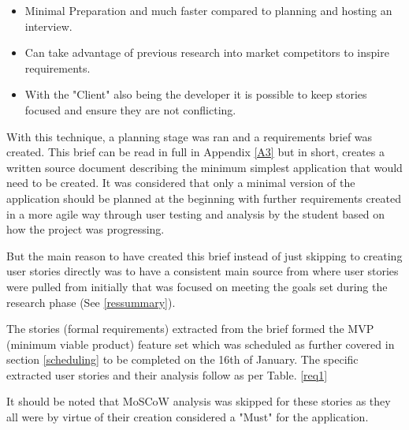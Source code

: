 \begin{itemize}
    \item Minimal Preparation and much faster compared to planning and hosting an interview.
    \item Can take advantage of previous research into market competitors to inspire requirements.
    \item With the "Client" also being the developer it is possible to keep stories focused and ensure they are not conflicting.
\end{itemize}

With this technique, a planning stage was ran and a requirements brief was created. This brief can be read in full in Appendix \ref{A3} but in short, creates a written source document describing the minimum simplest application that would need to be created. It was considered that only a minimal version of the application should be planned at the beginning with further requirements created in a more agile way through user testing and analysis by the student based on how the project was progressing.

But the main reason to have created this brief instead of just skipping to creating user stories directly was to have a consistent main source from where user stories were pulled from initially that was focused on meeting the goals set during the research phase (See \ref{ressummary}).

The stories (formal requirements) extracted from the brief formed the MVP (minimum viable product) feature set which was scheduled as further covered in section \ref{scheduling} to be completed on the 16th of January. The specific extracted user stories and their analysis follow as per Table. \ref{req1}

It should be noted that MoSCoW analysis was skipped for these stories as they all were by virtue of their creation considered a "Must" for the application.

